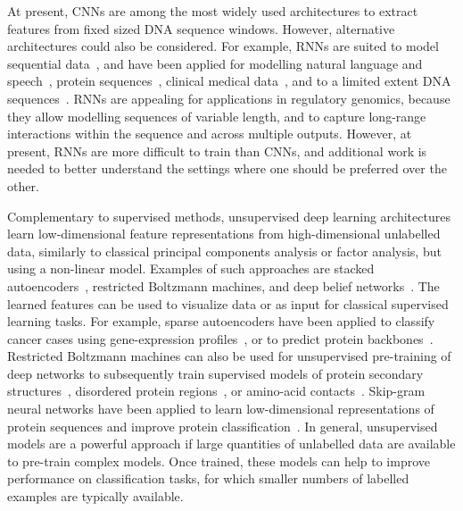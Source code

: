 At present, CNNs are among the most widely used architectures to extract features from fixed sized DNA sequence windows. However, alternative architectures could also be considered. For example, RNNs are suited to model sequential data~\citep{lipton_critical_2015}, and have been applied for modelling natural language and speech~\citep{che_distilling_2015,deng_deep_2015,graves_speech_2013,hinton_deep_2012,sutskever_sequence_2014,xiong_dynamic_2016}, protein sequences~\citep{agathocleous_protein_2010,sonderby_protein_2014}, clinical medical data~\citep{che_distilling_2015}, and to a limited extent DNA sequences~\citep{lee_dna-level_2015}. RNNs are appealing for applications in regulatory genomics, because they allow modelling sequences of variable length, and to capture long-range interactions within the sequence and across multiple outputs. However, at present, RNNs are more difficult to train than CNNs, and additional work is needed to better understand the settings where one should be preferred over the other.

Complementary to supervised methods, unsupervised deep learning architectures learn low-dimensional feature representations from high-dimensional unlabelled data, similarly to classical principal components analysis or factor analysis, but using a non-linear model. Examples of such approaches are stacked autoencoders~\citep{vincent_stacked_2010}, restricted Boltzmann machines, and deep belief networks~\citep{hinton_reducing_2006}. The learned features can be used to visualize data or as input for classical supervised learning tasks. For example, sparse autoencoders have been applied to classify cancer cases using gene-expression profiles~\citep{fakoor_using_2013}, or to predict protein backbones~\citep{lyons_predicting_2014-1}. Restricted Boltzmann machines can also be used for unsupervised pre-training of deep networks to subsequently train supervised models of protein secondary structures~\citep{spencer_deep_2015}, disordered protein regions~\citep{eickholt_predicting_2012,eickholt_dndisorder:_2013}, or amino-acid contacts~\citep{eickholt_predicting_2012}. Skip-gram neural networks have been applied to learn low-dimensional representations of protein sequences and improve protein classification~\citep{asgari_protvec:_2015}. In general, unsupervised models are a powerful approach if large quantities of unlabelled data are available to pre-train complex models. Once trained, these models can help to improve performance on classification tasks, for which smaller numbers of labelled examples are typically available.


